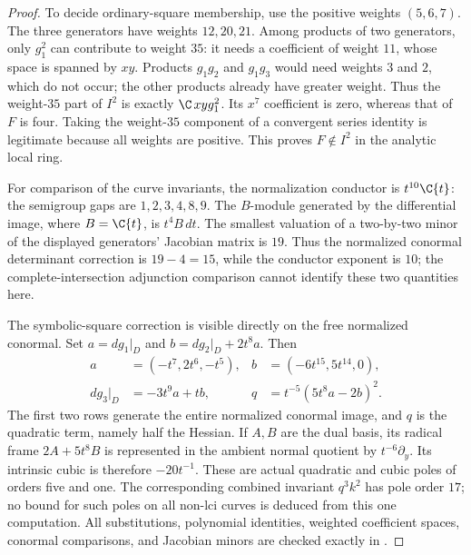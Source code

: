 \begin{proof}
To decide ordinary-square membership, use the positive weights
$(5,6,7)$. The three generators have weights $12,20,21$.
Among products of two generators, only $g_1^2$ can contribute
to weight $35$: it needs a coefficient of weight $11$, whose
space is spanned by $xy$. Products $g_1g_2$ and $g_1g_3$ would
need weights $3$ and $2$, which do not occur; the other products
already have greater weight. Thus the weight-$35$ part of $I^2$
is exactly $\C\,xyg_1^2$. Its $x^7$ coefficient is zero, whereas
that of $F$ is four. Taking the weight-$35$ component of a
convergent series identity is legitimate because all weights are
positive. This proves $F\notin I^2$ in the analytic local ring.

For comparison of the curve invariants, the normalization conductor
is $t^{10}\C\{t\}$: the semigroup gaps are $1,2,3,4,8,9$.
The $B$-module generated by the differential image, where $B=\C\{t\}$, is $t^4B\,dt$.
The smallest valuation of a two-by-two minor of the displayed
generators' Jacobian matrix is $19$. Thus the normalized conormal
determinant correction is $19-4=15$, while the conductor exponent
is $10$; the complete-intersection adjunction comparison cannot
identify these two quantities here.

The symbolic-square correction is visible directly on the free
normalized conormal. Set $a=dg_1|_D$ and
$b=dg_2|_D+2t^8a$. Then
\[
 \begin{aligned}
 a&=(-t^7,2t^6,-t^5),& b&=(-6t^{15},5t^{14},0),\\
 dg_3|_D&=-3t^9a+tb,&
 q&=t^{-5}(5t^8a-2b)^2.
 \end{aligned}                                                   \tag{A.NL.5}
\]
The first two rows generate the entire normalized conormal image,
and $q$ is the quadratic term, namely half the Hessian.
If $A,B$ are the dual basis, its radical frame $2A+5t^8B$
is represented in the ambient normal quotient by $t^{-6}\partial_y$.
Its intrinsic cubic is therefore $-20t^{-1}$. These are actual
quadratic and cubic poles of orders five and one. The corresponding
combined invariant $q^3k^2$ has pole order $17$; no bound for such
poles on all non-lci curves is deduced from this one computation.
All substitutions, polynomial identities, weighted coefficient
spaces, conormal comparisons, and Jacobian minors are checked
exactly in .
\end{proof}
